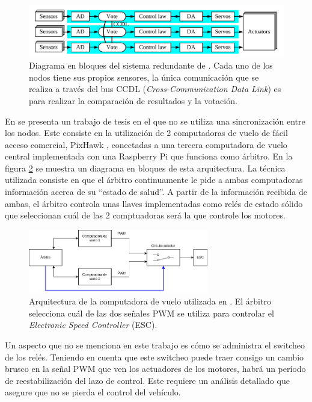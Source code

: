 \begin{figure}[H]
    \centering
    \includegraphics[width=\textwidth]{img/RS_485_sync.png}
    \caption{Diagrama en bloques del sistema redundante de \cite{wang2008development}. Cada uno de los nodos tiene sus propios sensores, la única comunicación que se realiza a través del bus CCDL (\textit{Cross-Communication Data Link}) es para realizar la comparación de resultados y la votación.}
    \label{fig:RS_485_sync}
\end{figure}

En \cite{thesis_redundant_ROS} se presenta un trabajo de tesis en el que no se utiliza una sincronización entre los nodos. Este consiste en la utilización de 2 computadoras de vuelo de fácil acceso comercial, PixHawk \cite{dronecode-foundation-2023}, conectadas a una tercera computadora de vuelo central implementada con una Raspberry Pi que funciona como árbitro. En la figura \ref{fig:ROS_redundancy} se muestra un diagrama en bloques de esta arquitectura. La técnica utilizada consiste en que el árbitro continuamente le pide a ambas computadoras información acerca de su ``estado de salud''. A partir de la información recibida de ambas, el árbitro controla unas llaves implementadas como relés de estado sólido que seleccionan cuál de las 2 comptuadoras será la que controle los motores.

\begin{figure}[H]
    \centering
    \includegraphics[width=0.7\textwidth]{img/ROS_redundancy.png}
    \caption{Arquitectura de la computadora de vuelo utilizada en \cite{thesis_redundant_ROS}. El árbitro selecciona cuál de las dos señales PWM se utiliza para controlar el \textit{Electronic Speed Controller} (ESC).}
    \label{fig:ROS_redundancy}
\end{figure}

Un aspecto que no se menciona en este trabajo es cómo se administra el switcheo de los relés. Teniendo en cuenta que este switcheo puede traer consigo un cambio brusco en la señal PWM que ven los actuadores de los motores, habrá un período de reestabilización del lazo de control. Este requiere un análisis detallado que asegure que no se pierda el control del vehículo.




